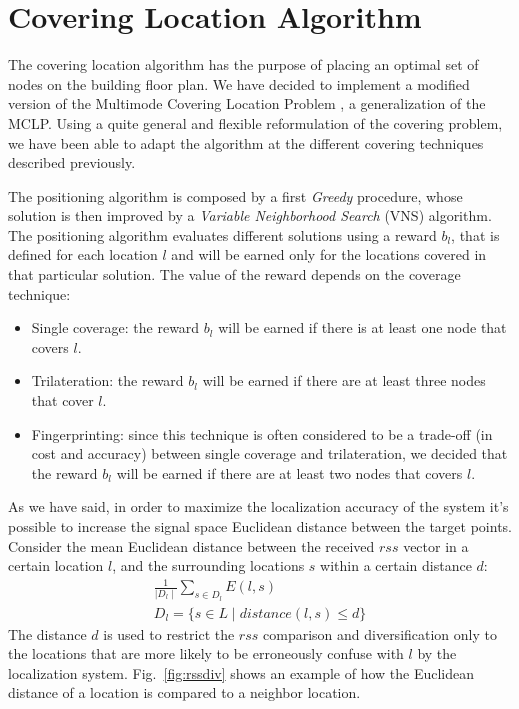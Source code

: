 \section{Covering Location Algorithm}\label{subsec:placing}
The covering location algorithm has the purpose of placing an optimal set of nodes on the building floor plan. We have decided to implement a modified version of the Multimode Covering Location Problem \cite{Colombo2016}, a generalization of the MCLP. Using a quite general and flexible reformulation of the covering problem, we have been able to adapt the algorithm at the different covering techniques described previously.

The positioning algorithm is composed by a first \emph{Greedy} procedure, whose solution is then improved by a \emph{Variable Neighborhood Search} (VNS) algorithm.
The positioning algorithm evaluates different solutions using a reward \(b_l\), that is defined for each location $l$ and will be earned only for the locations covered in that particular solution. The value of the reward depends on the coverage technique:

\begin{itemize}
\item Single coverage: the reward \(b_l\) will be earned if there is at least one node that covers $l$.
\item Trilateration: the reward \(b_l\) will be earned if there are at least three nodes that cover $l$.
\item Fingerprinting: since this technique is often considered to be a trade-off (in cost and accuracy) between single coverage and trilateration, we decided that the reward \(b_l\) will be earned if there are at least two nodes that covers $l$.
\end{itemize}

As we have said, in order to maximize the localization accuracy of the system it's possible to increase the signal space Euclidean distance between the target points.
Consider the mean Euclidean distance between the received $rss$ vector in a certain location \(l\), and the surrounding locations $s$ within a certain distance \(d\):
\begin{equation}\label{eq:fing}
\begin{gathered}
\frac{1}{\mid D_l \mid} \sum\limits_{s \in D_l} E(l,s)\\
D_l = \{s \in L \mid distance(l,s)  \leq d\}
\end{gathered}
\end{equation}
The distance $d$ is used to restrict the $rss$ comparison and diversification only to the locations that are more likely to be erroneously confuse with $l$ by the localization system. Fig.~\ref{fig:rssdiv} shows an example of how the Euclidean distance of a location is compared to a neighbor location.

